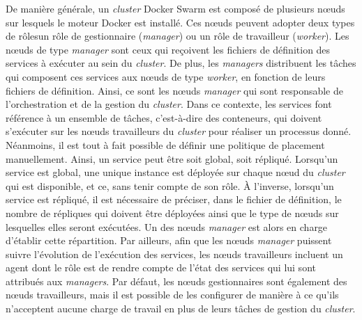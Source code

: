 De manière générale, un \textit{cluster} Docker Swarm est composé de plusieurs n\oe{}uds sur lesquels le moteur Docker est installé. Ces n\oe{}uds peuvent adopter deux types de rôles\textemdash un rôle de gestionnaire (\textit{manager}) ou un rôle de travailleur (\textit{worker}). Les n\oe{}uds de type \textit{manager} sont ceux qui reçoivent les fichiers de définition des services à exécuter au sein du \textit{cluster}. De plus, les \textit{managers} distribuent les tâches qui composent ces services aux n\oe{}uds de type \textit{worker}, en fonction de leurs fichiers de définition. Ainsi, ce sont les n\oe{}uds \textit{manager} qui sont responsable de l'orchestration et de la gestion du \textit{cluster}. Dans ce contexte, les services font référence à un ensemble de tâches, c'est-à-dire des conteneurs, qui doivent s'exécuter sur les n\oe{}uds travailleurs du \textit{cluster} pour réaliser un processus donné. Néanmoins, il est tout à fait possible de définir une politique de placement manuellement. Ainsi, un service peut être soit global, soit répliqué. Lorsqu'un service est global, une unique instance est déployée sur chaque n\oe{}ud du \textit{cluster} qui est disponible, et ce, sans tenir compte de son rôle.  À l'inverse, lorsqu'un service est répliqué, il est nécessaire de préciser, dans le fichier de définition, le nombre de répliques qui doivent être déployées ainsi que le type de n\oe{}uds sur lesquelles elles seront exécutées. Un des n\oe{}uds \textit{manager} est alors en charge d'établir cette répartition. Par ailleurs, afin que les n\oe{}uds \textit{manager} puissent suivre l'évolution de l'exécution des services, les n\oe{}uds travailleurs incluent un agent dont le rôle est de rendre compte de l'état des services qui lui sont attribués aux \textit{managers}. Par défaut, les n\oe{}uds gestionnaires sont également des n\oe{}uds travailleurs, mais il est possible de les configurer de manière à ce qu'ils n'acceptent aucune charge de travail en plus de leurs tâches de gestion du \textit{cluster}.


